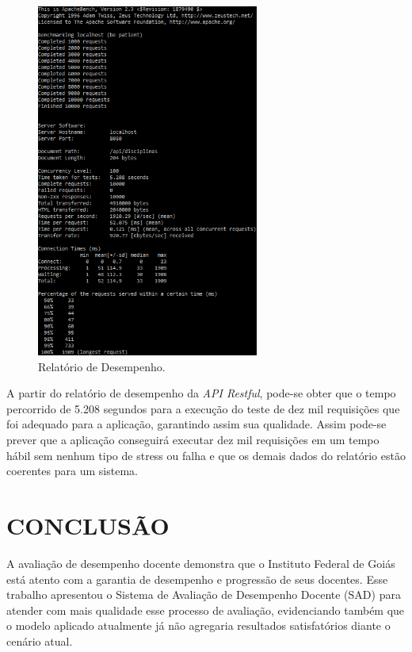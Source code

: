         \begin{figure}[h]
        \centering
        \includegraphics[width=0.65\textwidth]{./img/RelatorioDesempenho.png}
        \caption{Relatório de Desempenho.}
        \label{fig:ComadoRequisicoes}
        \end{figure}
        
    A partir do relatório de desempenho da \textit{API Restful}, pode-se obter que o tempo percorrido de 5.208 segundos para a execução do teste de dez mil requisições que foi adequado para a aplicação, garantindo assim sua qualidade. Assim pode-se prever que a aplicação conseguirá executar dez mil requisições em um tempo hábil sem nenhum tipo de stress ou falha e que os demais dados do relatório estão coerentes para um sistema.
        
    
    
\chapter{CONCLUSÃO}

    A avaliação de desempenho docente demonstra que o Instituto Federal de Goiás está atento com a garantia de desempenho e progressão de seus docentes. Esse trabalho apresentou o Sistema de Avaliação de Desempenho Docente (SAD) para atender com mais qualidade esse processo de avaliação, evidenciando também que o modelo aplicado atualmente já não agregaria resultados satisfatórios diante o cenário atual.

